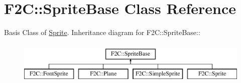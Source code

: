 \hypertarget{class_f2_c_1_1_sprite_base}{
\section{F2C::SpriteBase Class Reference}
\label{class_f2_c_1_1_sprite_base}
}


Basis Class of \hyperlink{class_f2_c_1_1_sprite}{Sprite}.  
Inheritance diagram for F2C::SpriteBase::\begin{figure}[H]
\begin{center}
\leavevmode
\includegraphics[height=2cm]{class_f2_c_1_1_sprite_base}
\end{center}
\end{figure}
